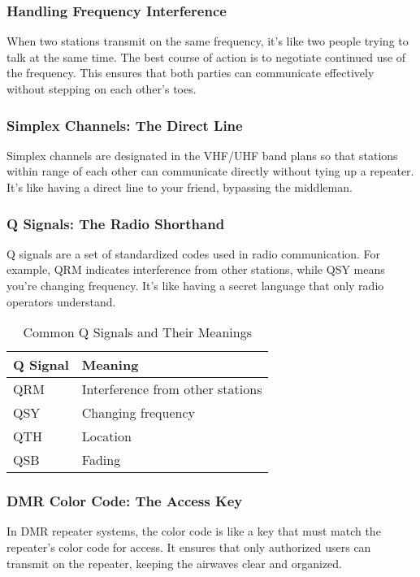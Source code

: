 \subsubsection*{Handling Frequency Interference}
When two stations transmit on the same frequency, it's like two people trying to talk at the same time. The best course of action is to negotiate continued use of the frequency. This ensures that both parties can communicate effectively without stepping on each other's toes.

\subsubsection*{Simplex Channels: The Direct Line}
Simplex channels are designated in the VHF/UHF band plans so that stations within range of each other can communicate directly without tying up a repeater. It's like having a direct line to your friend, bypassing the middleman.

\subsubsection*{Q Signals: The Radio Shorthand}
Q signals are a set of standardized codes used in radio communication. For example, QRM indicates interference from other stations, while QSY means you're changing frequency. It's like having a secret language that only radio operators understand.

\begin{table}[h]
    \centering
    \begin{tabular}{|l|l|}
        \hline
        \textbf{Q Signal} & \textbf{Meaning} \\
        \hline
        QRM & Interference from other stations \\
        QSY & Changing frequency \\
        QTH & Location \\
        QSB & Fading \\
        \hline
    \end{tabular}
    \caption{Common Q Signals and Their Meanings}
    \label{tab:q-signals}
\end{table}

\subsubsection*{DMR Color Code: The Access Key}
In DMR repeater systems, the color code is like a key that must match the repeater's color code for access. It ensures that only authorized users can transmit on the repeater, keeping the airwaves clear and organized.

